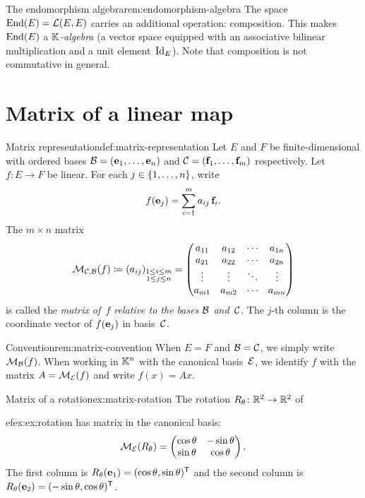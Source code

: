 \begin{remark}{The endomorphism algebra}{rem:endomorphism-algebra}
The space $\operatorname{End}(E) = {\mathcal{L}}(E,E)$ carries an additional operation:
composition. This makes $\operatorname{End}(E)$ a \emph{${\mathbb{K}}$-algebra} (a vector
space equipped with an associative bilinear multiplication and a
unit element~$\operatorname{Id}_E$). Note that composition is not commutative
in general.
\end{remark}


\section{Matrix of a linear map}\label{sec:matrix-of-linear-map}

\begin{definition}{Matrix representation}{def:matrix-representation}
Let $E$ and $F$ be finite-dimensional with ordered bases
${\mathcal{B}} = (\mathbf{e}_{1},\ldots,\mathbf{e}_{n})$ and
${\mathcal{C}} = (\mathbf{f}_{1},\ldots,\mathbf{f}_{m})$ respectively.
Let $f\colon E\to F$ be linear. For each $j\in\left\{1,\ldots,n\right\}$, write
\[
  f(\mathbf{e}_{j}) = \sum_{i=1}^{m} a_{ij}\,\mathbf{f}_{i}.
\]
The $m\times n$ matrix
\[
  \mathcal{M}_{{\mathcal{C}},{\mathcal{B}}}(f) \coloneqq (a_{ij})_{\substack{1\le i\le m\\1\le j\le n}}
  = \begin{pmatrix}
    a_{11} & a_{12} & \cdots & a_{1n}\\
    a_{21} & a_{22} & \cdots & a_{2n}\\
    \vdots & \vdots & \ddots & \vdots\\
    a_{m1} & a_{m2} & \cdots & a_{mn}
  \end{pmatrix}
\]
is called the \emph{matrix of~$f$ relative to the bases ${\mathcal{B}}$
and~${\mathcal{C}}$}. The $j$-th column is the coordinate vector of $f(\mathbf{e}_{j})$
in basis~${\mathcal{C}}$.
\end{definition}

\begin{remark}{Convention}{rem:matrix-convention}
When $E = F$ and ${\mathcal{B}} = {\mathcal{C}}$, we simply write $\mathcal{M}_{\mathcal{B}}(f)$.
When working in ${\mathbb{K}}^n$ with the canonical basis~${\mathcal{E}}$, we identify
$f$ with the matrix $A = \mathcal{M}_{\mathcal{E}}(f)$ and write $f(x) = Ax$.
\end{remark}

\begin{example}{Matrix of a rotation}{ex:matrix-rotation}
The rotation $R_\theta\colon{\mathbb{R}}^2\to{\mathbb{R}}^2$ of

ef{ex:ex:rotation} has matrix in the canonical basis:
\[
  \mathcal{M}_{\mathcal{E}}(R_\theta)
  = \begin{pmatrix}\cos\theta & -\sin\theta\\
    \sin\theta & \cos\theta\end{pmatrix}.
\]
The first column is $R_\theta(\mathbf{e}_{1}) = (\cos\theta,\sin\theta)^{\mathsf{T}}$
and the second column is $R_\theta(\mathbf{e}_{2}) = (-\sin\theta,\cos\theta)^{\mathsf{T}}$.
\end{example}

